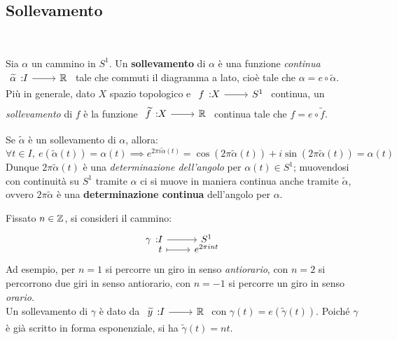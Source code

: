 \subsection{Sollevamento}

\begin{define}[Sollevamento.]~{}\\
	\begin{minipage}[t]{0.78\textwidth}
		Sia $\alpha$ un cammino in $S^1$. Un \textbf{sollevamento} di $\alpha$ è una funzione \textit{continua} $\funz {\widetilde{\alpha}} I \realset$ tale che commuti il diagramma a lato, cioè tale che $\alpha= e\circ \widetilde{\alpha}$. \\
		Più in generale, dato $X$ spazio topologico e $\funz f X {S^1}$ continua, un \textit{sollevamento} di $f$ è la funzione $\funz {\widetilde{f}} X \realset$ continua tale che $f=e\circ \widetilde{f}$.
	\end{minipage}
	\begin{minipage}[t]{0.21\textwidth}\vspace{-10pt}
	\end{minipage}
\end{define}
Se $\widetilde{\alpha}$ è un sollevamento di $\alpha$, allora:
	\begin{equation*}
		\forall t\in I, \ e(\widetilde{\alpha}(t))=\alpha(t)\implies e^{2\pi i \widetilde{\alpha}(t)}=\cos(2\pi \widetilde{\alpha}(t))+i\sin(2\pi\widetilde{\alpha}(t))=\alpha(t)
	\end{equation*}
Dunque $2\pi\widetilde{\alpha}(t)$ è una \textit{determinazione dell'angolo} per $\alpha(t)\in S^1$; muovendosi con continuità su $S^1$ tramite $\alpha$ ci si muove in maniera continua anche tramite $\widetilde{\alpha}$, ovvero $2\pi\widetilde{\alpha}$ è una \textbf{determinazione continua} dell'angolo per $\alpha$.
\begin{example}
	Fissato $n\in\mathbb{Z}$, si consideri il cammino:
	\begin{equation*}
		\funztot \gamma I {S^1} t {e^{2\pi i nt}}
	\end{equation*}
	Ad esempio, per $n=1$ si percorre un giro in senso \textit{antiorario}, con $n=2$ si percorrono due giri in senso antiorario, con $n=-1$ si percorre un giro in senso \textit{orario}.\\
	Un sollevamento di $\gamma$ è dato da $\funz {\widetilde{y}} I {\realset}$ con $\gamma(t)=e(\widetilde{\gamma}(t))$. Poiché $\gamma$ è già scritto in forma esponenziale, si ha $\widetilde{\gamma}(t)=nt$.
\end{example}
